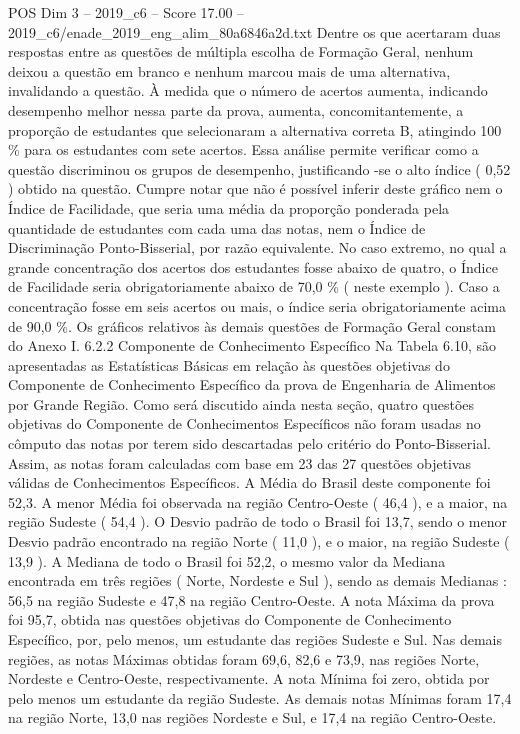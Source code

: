 \begin{textsample}{POS Dim 3 – 2019\_c6 – Score 17.00 – 2019\_c6/enade\_2019\_eng\_alim\_80a6846a2d.txt}
Dentre os que acertaram duas respostas entre as questões de múltipla escolha de Formação Geral, nenhum deixou a questão em branco e nenhum marcou mais de uma alternativa, invalidando a questão.
À medida que o número de acertos aumenta, indicando desempenho melhor nessa parte da prova, aumenta, concomitantemente, a proporção de estudantes que selecionaram a alternativa correta B, atingindo 100 \% para os estudantes com sete acertos.
Essa análise permite verificar como a questão discriminou os grupos de desempenho, justificando -se o alto índice ( 0,52 ) obtido na questão.
Cumpre notar que não é possível inferir deste gráfico nem o Índice de Facilidade, que seria uma média da proporção ponderada pela quantidade de estudantes com cada uma das notas, nem o Índice de Discriminação Ponto-Bisserial, por razão equivalente.
No caso extremo, no qual a grande concentração dos acertos dos estudantes fosse abaixo de quatro, o Índice de Facilidade seria obrigatoriamente abaixo de 70,0 \% ( neste exemplo ).
Caso a concentração fosse em seis acertos ou mais, o índice seria obrigatoriamente acima de 90,0 \%.
Os gráficos relativos às demais questões de Formação Geral constam do Anexo I. 6.2.2 Componente de Conhecimento Específico Na Tabela 6.10, são apresentadas as Estatísticas Básicas em relação às questões objetivas do Componente de Conhecimento Específico da prova de Engenharia de Alimentos por Grande Região.
Como será discutido ainda nesta seção, quatro questões objetivas do Componente de Conhecimentos Específicos não foram usadas no cômputo das notas por terem sido descartadas pelo critério do Ponto-Bisserial.
Assim, as notas foram calculadas com base em 23 das 27 questões objetivas válidas de Conhecimentos Específicos.
A Média do Brasil deste componente foi 52,3.
A menor Média foi observada na região Centro-Oeste ( 46,4 ), e a maior, na região Sudeste ( 54,4 ).
O Desvio padrão de todo o Brasil foi 13,7, sendo o menor Desvio padrão encontrado na região Norte ( 11,0 ), e o maior, na região Sudeste ( 13,9 ).
A Mediana de todo o Brasil foi 52,2, o mesmo valor da Mediana encontrada em três regiões ( Norte, Nordeste e Sul ), sendo as demais Medianas : 56,5 na região Sudeste e 47,8 na região Centro-Oeste.
A nota Máxima da prova foi 95,7, obtida nas questões objetivas do Componente de Conhecimento Específico, por, pelo menos, um estudante das regiões Sudeste e Sul.
Nas demais regiões, as notas Máximas obtidas foram 69,6, 82,6 e 73,9, nas regiões Norte, Nordeste e Centro-Oeste, respectivamente.
A nota Mínima foi zero, obtida por pelo menos um estudante da região Sudeste.
As demais notas Mínimas foram 17,4 na região Norte, 13,0 nas regiões Nordeste e Sul, e 17,4 na região Centro-Oeste.

\end{textsample}
